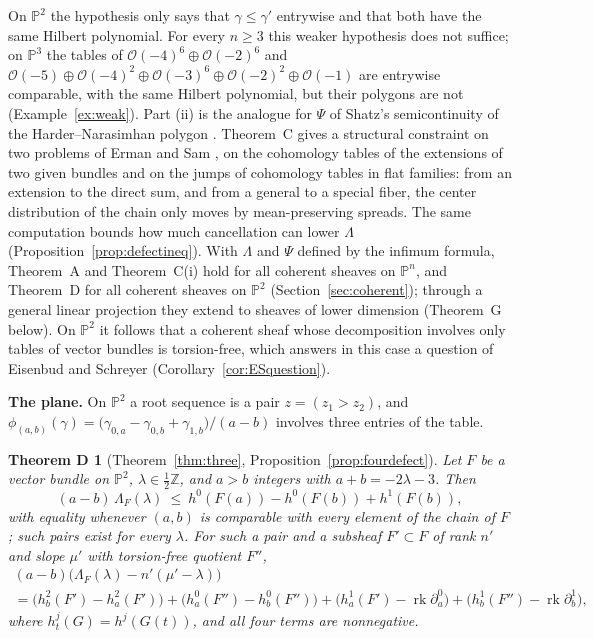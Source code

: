 \documentclass[11pt]{amsart}
\newtheorem*{theoremD}{Theorem D}
\theoremstyle{definition}
\theoremstyle{remark}
\newcommand{\PP}{\mathbb{P}}
\newcommand{\ZZ}{\mathbb{Z}}
\newcommand{\OO}{\mathcal{O}}
\DeclareMathOperator{\rk}{rk}
\begin{document}
On $\PP^2$ the hypothesis only says that $\gamma\le\gamma'$ entrywise and that both have the same Hilbert polynomial. For every $n\ge3$ this weaker hypothesis does not suffice; on $\PP^3$ the tables of $\OO(-4)^{6}\oplus\OO(-2)^{6}$ and $\OO(-5)\oplus\OO(-4)^{2}\oplus\OO(-3)^{6}\oplus\OO(-2)^{2}\oplus\OO(-1)$ are entrywise comparable, with the same Hilbert polynomial, but their polygons are not (Example~\ref{ex:weak}). Part (ii) is the analogue for $\Psi$ of Shatz's semicontinuity of the Harder--Narasimhan polygon \cite{Sh77}. Theorem~C gives a structural constraint on two problems of Erman and Sam \cite[Problem~4.3 and \S5]{ErS}, on the cohomology tables of the extensions of two given bundles and on the jumps of cohomology tables in flat families: from an extension to the direct sum, and from a general to a special fiber, the center distribution of the chain only moves by mean-preserving spreads. The same computation bounds how much cancellation can lower $\Lambda$ (Proposition~\ref{prop:defectineq}). With $\Lambda$ and $\Psi$ defined by the infimum formula, Theorem~A and Theorem~C(i) hold for all coherent sheaves on $\PP^n$, and Theorem~D for all coherent sheaves on $\PP^2$ (Section~\ref{sec:coherent}); through a general linear projection they extend to sheaves of lower dimension (Theorem~G below). On $\PP^2$ it follows that a coherent sheaf whose decomposition involves only tables of vector bundles is torsion-free, which answers in this case a question of Eisenbud and Schreyer \cite{ES10} (Corollary~\ref{cor:ESquestion}).

\medskip\noindent\textbf{The plane.}
On $\PP^2$ a root sequence is a pair $z=(z_1>z_2)$, and $\phi_{(a,b)}(\gamma)=\big(\gamma_{0,a}-\gamma_{0,b}+\gamma_{1,b}\big)/(a-b)$ involves three entries of the table.

\begin{theoremD}[Theorem~\ref{thm:three}, Proposition~\ref{prop:fourdefect}]
Let $F$ be a vector bundle on $\PP^2$, $\lambda\in\frac12\ZZ$, and $a>b$ integers with $a+b=-2\lambda-3$. Then
\[
(a-b)\,\Lambda_F(\lambda)\ \le\ h^0(F(a))-h^0(F(b))+h^1(F(b)),
\]
with equality whenever $(a,b)$ is comparable with every element of the chain of $F$; such pairs exist for every $\lambda$. For such a pair and a subsheaf $F'\subset F$ of rank $n'$ and slope $\mu'$ with torsion-free quotient $F''$,
\begin{multline*}
(a-b)\big(\Lambda_F(\lambda)-n'(\mu'-\lambda)\big)\\=\big(h^2_b(F')-h^2_a(F')\big)+\big(h^0_a(F'')-h^0_b(F'')\big)+\big(h^1_a(F')-\rk\partial^0_a\big)+\big(h^1_b(F'')-\rk\partial^1_b\big),
\end{multline*}
where $h^j_t(G)=h^j(G(t))$, and all four terms are nonnegative.
\end{theoremD}
\end{document}
